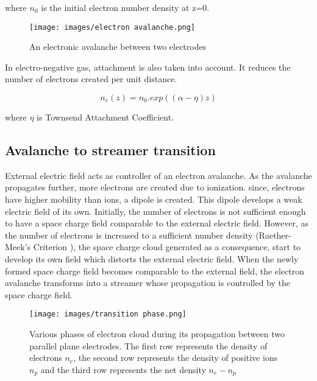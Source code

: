 \documentclass[paper=a4, fontsize=13pt]{scrartcl}
\begin{document}
where $n_0$ is the initial electron number density at z=0.


\begin{figure}[t!]
\centering
\texttt{[image: images/electron avalanche.png]}
 \caption{An electronic avalanche between two electrodes \cite{Raizer1991GasRazryada}}
  \label{fig:avalanche}
\end{figure}

In electro-negative gas, attachment is also taken into account. It reduces the number of electrons created per unit distance.

\begin{equation}
n_e(z) = n_0. exp ((\alpha-\eta) z)
\end{equation}

where $\eta$ is Townsend Attachment Coefficient.


\subsection{Avalanche to streamer transition}

External electric field acts as controller of an electron avalanche. As the avalanche propagates further, more electrons are created due to ionization. since, electrons have higher mobility than ions, a dipole is created. This dipole develops a weak electric field of its own. Initially, the number of electrons is not sufficient enough to have a space charge field comparable to the external electric field. However, as the number of electrons is increased to a sufficient number density (Raether-Meek's Criterion \cite{Raizer1991GasRazryada}), the space charge cloud generated as a consequence, start to develop its own field which distorts the external electric field. When the newly formed space charge field becomes comparable to the external field, the electron avalanche transforms into a streamer whose propagation is controlled by the space charge field. 


\begin{figure}[t!]
\centering
\texttt{[image: images/transition phase.png]}
 \caption{Various phases of electron cloud during its propagation between two parallel plane electrodes. The first row represents the density of electrons $n_e$, the second row represents the density of positive ions $n_p$ and the third row represents the net density $n_e - n_p$ \cite{Ebert2006TheStreamers}}
  \label{fig:transition phase}
\end{figure}
\end{document}
